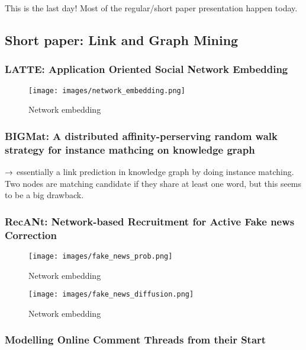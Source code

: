 This is the last day! Most of the regular/short paper presentation happen today.

\subsection{Short paper: Link and Graph Mining}

\subsubsection{LATTE: Application Oriented Social Network Embedding}

\begin{figure}[ht!]
    \centering
    \texttt{[image: images/network\_embedding.png]}
    \caption{Network embedding}
    \label{fig:my_label}
\end{figure}{}


\subsubsection{BIGMat: A distributed affinity-perserving random walk strategy for instance mathcing on knowledge graph}

$\rightarrow$ essentially a link prediction in knowledge graph by doing instance matching. Two nodes are matching candidate if they share at least one word, but this seems to be a big drawback.

\subsubsection{RecANt: Network-based Recruitment for Active Fake news Correction}

\begin{figure}[ht!]
    \centering
    \texttt{[image: images/fake\_news\_prob.png]}
    \caption{Network embedding}
    \label{fig:my_label}
\end{figure}{}

\begin{figure}[ht!]
    \centering
    \texttt{[image: images/fake\_news\_diffusion.png]}
    \caption{Network embedding}
    \label{fig:my_label}
\end{figure}{}

\subsubsection{Modelling Online Comment Threads from their Start}

